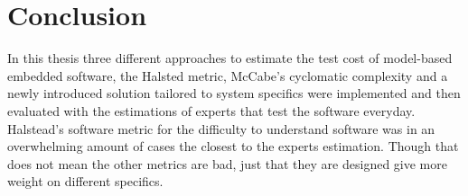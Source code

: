 \section{Conclusion}



In this thesis three different approaches to estimate the test cost of model-based embedded software, the Halsted metric, McCabe's cyclomatic complexity  and a newly introduced solution tailored to system specifics were implemented and then evaluated with the estimations of experts that test the software everyday. Halstead's software metric for the difficulty to understand software was in an overwhelming amount of cases the closest to the experts estimation. Though that does not mean the other metrics are bad, just that they are designed give more weight on different specifics.